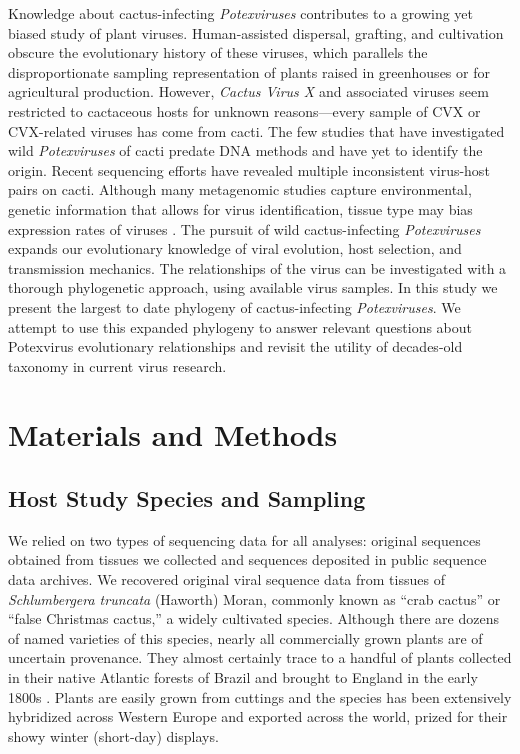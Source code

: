 \documentclass[fleqn,10pt,lineno]{wlpeerj}
\begin{document}
Knowledge about cactus-infecting \textit{Potexviruses} contributes to a growing yet biased study of plant viruses. 
Human-assisted dispersal, grafting, and cultivation obscure the evolutionary history of these viruses, which parallels the disproportionate sampling representation of plants raised in greenhouses or for agricultural production. 
However, \textit{Cactus Virus X} and associated viruses seem restricted to cactaceous hosts for unknown reasons---every sample of CVX or CVX-related viruses has come from cacti.
The few studies that have investigated wild \textit{Potexviruses} of cacti predate DNA methods and have yet to identify the origin.
Recent sequencing efforts have revealed multiple inconsistent virus-host pairs on cacti.
Although many metagenomic studies capture environmental, genetic information that allows for virus identification, tissue type may bias expression rates of viruses \citep{lacroix2016methodological}.
The pursuit of wild cactus-infecting \textit{Potexviruses} expands our evolutionary knowledge of viral evolution, host selection, and transmission mechanics. 
The relationships of the virus can be investigated with a thorough phylogenetic approach, using available virus samples. 
In this study we present the largest to date phylogeny of cactus-infecting \textit{Potexviruses}.
We attempt to use this expanded phylogeny to answer relevant questions about Potexvirus evolutionary relationships and revisit the utility of decades-old taxonomy in current virus research. 


\section*{Materials and Methods}

\subsection*{Host Study Species and Sampling}

We relied on two types of sequencing data for all analyses: original sequences obtained from tissues we collected and sequences deposited in public sequence data archives. 
We recovered original viral sequence data from tissues of \textit{Schlumbergera truncata} (Haworth) Moran, commonly known as ``crab cactus'' or ``false Christmas cactus,'' a widely cultivated species.
Although there are dozens of named varieties of this species, nearly all commercially grown plants are of uncertain provenance. 
They almost certainly trace to a handful of plants collected in their native Atlantic forests of Brazil and brought to England in the early 1800s \citep{boyle2003}. 
Plants are easily grown from cuttings and the species has been extensively hybridized across Western Europe and exported across the world, prized for their showy winter (short-day) displays.
\end{document}

